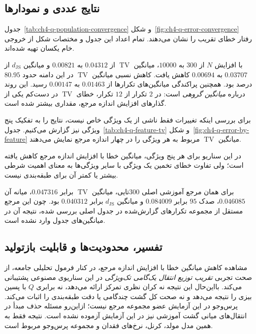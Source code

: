 \subsection{نتایج عددی و نمودارها}
\label{subsec:ch4-q-numerical}
جدول~\ref{tab:ch4-q-population-convergence}
و شکل~\ref{fig:ch4-q-error-convergence}
رفتار خطای تقریب را نشان می‌دهند.
تمام اعداد این جدول و مختصات شکل
از خروجی خام یکسان تهیه شده‌اند.



با افزایش $N$ از $300$ به $10000$،
میانگین $\operatorname{TV}$ از $0.04312$
به $0.00821$ و میانگین $d_{\mathrm{JS}}$
از $0.03707$ به $0.00694$ کاهش یافت.
کاهش نسبی میانگین $\operatorname{TV}$
در این دامنه حدود $80.95$ درصد بود.
همچنین پراکندگی میانگین‌های تکرارها
از $0.01463$ به $0.00147$ رسید.
این روند درباره \emph{میانگین گروهی} است:
در $2$ تکرار از $12$ تکرار، خطای
$\operatorname{TV}$ در دست‌کم یکی از گذارهای
افزایش اندازه مرجع، مقداری بیشتر شده است.

برای بررسی اینکه تغییرات فقط ناشی از
یک ویژگی خاص نیست، نتایج را به تفکیک پنج
ویژگی نیز گزارش می‌کنیم.
جدول~\ref{tab:ch4-q-feature-tv}
و شکل~\ref{fig:ch4-q-error-by-feature}
میانگین $\operatorname{TV}$ مربوط به هر ویژگی را
در چهار اندازه مرجع نمایش می‌دهند.



در این سناریو برای هر پنج ویژگی، میانگین
خطا با افزایش اندازه مرجع کاهش یافته است؛
ولی تفاوت خطای تخمین یک ویژگی با سایر
ویژگی‌ها به معنای اهمیت شرطی بیشتر یا کمتر
آن برای طبقه‌بندی نیست.

برای همان مرجع آموزشی اصلی $300$تایی،
میانگین $\operatorname{TV}$ برابر $0.047316$،
میانه آن $0.046085$، صدک $95$
برابر $0.084009$ و میانگین
$d_{\mathrm{JS}}$ برابر $0.040312$ بود.
چون این مرجع مستقل از مجموعه تکرارهای
گزارش‌شده در جدول اصلی بررسی شده،
نتیجه آن در میانگین‌های جدول وارد نشده است.

\subsection{تفسیر، محدودیت‌ها و قابلیت بازتولید}
\label{subsec:ch4-q-discussion}
مشاهده کاهش میانگین خطا با افزایش
اندازه مرجع، در کنار فرمول تحلیلی جامعه،
از صحت تجربی \emph{تقریب توزیع انتقال
یک‌گامی تک‌ویژگی} در این سناریوی مصنوعی
پشتیبانی می‌کند. بااین‌حال این نتیجه
نه کران نظری تمرکز ارائه می‌دهد،
نه برابری $Q$ با پسین بیزی را نتیجه می‌دهد
و نه صحت کل گشت چندگامی یا دقت
طبقه‌بندی را اثبات می‌کند.
پرس‌وجو در این آزمایش عضو مجموعه مرجع نیست؛
ازاین‌رو مسئله حذف مبدأ در انتقال‌های
میانی گشت آموزشی نیز در این آزمایش آزموده نشده است.
نتیجه فقط به همین مدل مولد، کرنل،
نرخ‌های فقدان و مجموعه پرس‌وجو مربوط است.

